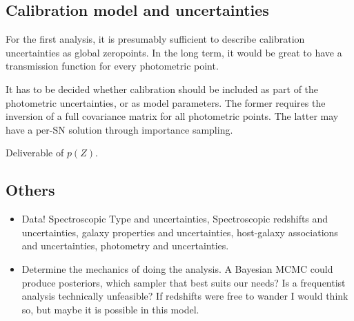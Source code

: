\documentclass[preprint,3p]{elsarticle}
\begin{document}
\subsection{Calibration model and uncertainties}
For the first analysis, it is presumably sufficient to describe calibration uncertainties
as global zeropoints.  In the long term, it would be great to have a transmission
function for every photometric point.

It has to be decided whether calibration should be included
as part of the photometric uncertainties, or as model parameters.
The former requires the inversion of a full covariance matrix for all photometric
points.  The latter may have a per-SN solution through importance sampling.

Deliverable of $p(Z)$.

\subsection{Others}

\begin{itemize}
\item Data! Spectroscopic Type and uncertainties, Spectroscopic redshifts and
uncertainties, galaxy properties and uncertainties, host-galaxy associations
and uncertainties, photometry and uncertainties.
\item Determine the mechanics of doing the analysis.  A Bayesian MCMC could produce posteriors, which sampler that best suits our needs? Is a frequentist
analysis technically unfeasible? If redshifts were free to wander I would think so, but maybe
it is possible in this model.
\end{itemize}
\end{document}
